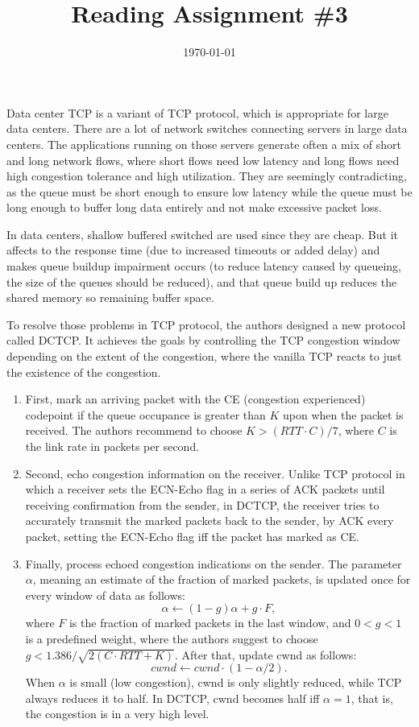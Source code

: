 \documentclass{homework}
\title{Reading Assignment \#3}
\date{\today}
\begin{document}
\maketitle

Data center TCP is a variant of TCP protocol, which is appropriate for large data centers. There are a lot of network switches connecting servers in large data centers. The applications running on those servers generate often a mix of short and long network flows, where short flows need low latency and long flows need high congestion tolerance and high utilization. They are seemingly contradicting, as the queue must be short enough to ensure low latency while the queue must be long enough to buffer long data entirely and not make excessive packet loss.

In data centers, shallow buffered switched are used since they are cheap. But it affects to the response time (due to increased timeouts or added delay) and makes queue buildup impairment occurs (to reduce latency caused by queueing, the size of the queues should be reduced), and that queue build up reduces the shared memory so remaining buffer space.

To resolve those problems in TCP protocol, the authors designed a new protocol called DCTCP. It achieves the goals by controlling the TCP congestion window depending on the extent of the congestion, where the vanilla TCP reacts to just the existence of the congestion.
\begin{enumerate}
  \item First, mark an arriving packet with the CE (congestion experienced) codepoint if the queue occupance is greater than $K$ upon when the packet is received. The authors recommend to choose $K > (RTT\cdot C)/7$, where $C$ is the link rate in packets per second.
  \item Second, echo congestion information on the receiver. Unlike TCP protocol in which a receiver sets the ECN-Echo flag in a series of ACK packets until receiving confirmation from the sender, in DCTCP, the receiver tries to accurately transmit the marked packets back to the sender, by ACK every packet, setting the ECN-Echo flag iff the packet has marked as CE.
  \item Finally, process echoed congestion indications on the sender. The parameter $\alpha$, meaning an estimate of the fraction of marked packets, is updated once for every window of data as follows:
  $$ \alpha\leftarrow (1-g)\alpha + g\cdot F ,$$
  where $F$ is the fraction of marked packets in the last window, and $0<g<1$ is a predefined weight, where the authors suggest to choose $g<1.386/\sqrt{2(C\cdot RTT + K)}$. After that, update cwnd as follows:
  $$ cwnd \leftarrow cwnd \cdot (1-\alpha/2). $$
  When $\alpha$ is small (low congestion), cwnd is only slightly reduced, while TCP always reduces it to half. In DCTCP, cwnd becomes half iff $\alpha=1$, that is, the congestion is in a very high level.
\end{enumerate}
\end{document}
